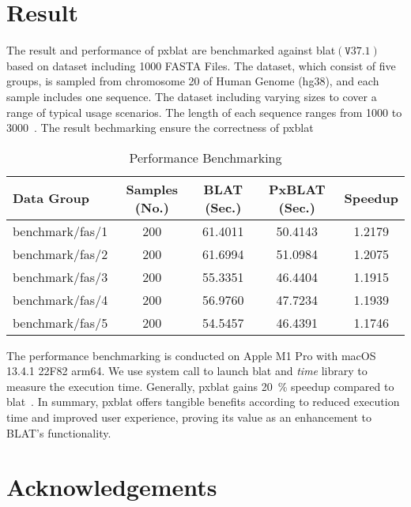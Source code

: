 \section*{Result}\label{sec:result}

The result and performance of \gls{pxblat} are benchmarked against \gls{blat}\(\left(\mathtt{V}37.1\right)\) based on dataset including \num{1000} FASTA Files.
The dataset, which consist of five groups,  is sampled from chromosome \num{20} of Human Genome (hg38), and each sample includes one sequence.
The dataset including varying sizes to cover a range of typical usage scenarios.
The length of each sequence ranges from \num{1000} to \num{3000}~.
The result bechmarking ensure the correctness of \gls{pxblat}~

\begin{table*}
	\centering
	\caption{Performance  Benchmarking}
	\label{tab:performance-evaluation}
	\begin{tabular}{lSSSS}
		\toprule
		Data Group      & {Samples (No.)} & {BLAT (Sec.)} & {PxBLAT (Sec.)} & {Speedup} \\
		\midrule
		benchmark/fas/1 & 200             & 61.4011       & 50.4143         & 1.2179    \\
		benchmark/fas/2 & 200             & 61.6994       & 51.0984         & 1.2075    \\
		benchmark/fas/3 & 200             & 55.3351       & 46.4404         & 1.1915    \\
		benchmark/fas/4 & 200             & 56.9760       & 47.7234         & 1.1939    \\
		benchmark/fas/5 & 200             & 54.5457       & 46.4391         & 1.1746    \\
		\bottomrule
	\end{tabular}
\end{table*}

The performance benchmarking is conducted on Apple M1 Pro with macOS 13.4.1 22F82 arm64.
We use system call to launch \gls{blat} and \emph{time} library to measure the execution time.
Generally, \gls{pxblat} gains \SI[per-mode=symbol,round-precision=0]{20}{\percent} speedup compared to \gls{blat}~.
In summary, \gls{pxblat}  offers tangible benefits according to reduced execution time and improved user experience, proving its value as an enhancement to BLAT's functionality.


\section*{Acknowledgements}\label{sec:acknowledgements}

